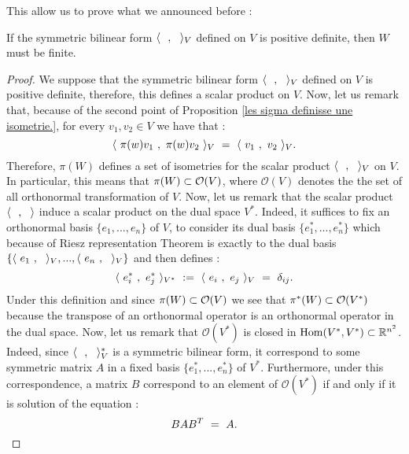 This allow us to prove what we announced before :
\begin{theorem}
	If the symmetric bilinear form  $\langle\text{ } \text{ },\text{ }\text{ }\rangle_V$ defined on $V$ is positive definite, then $W$ must be finite.
\end{theorem}
\begin{proof}
	We suppose that the symmetric bilinear form $\langle\text{ } \text{ },\text{ }\text{ }\rangle_V$ defined on $V$ is positive definite, therefore, this defines a scalar product on $V$. Now, let us remark that, because of the second point of Proposition \ref{les sigma definisse une isometrie.}, for every $v_1,v_2\in V$ we have that :
	\begin{equation}
	\langle\text{ } \pi(w)v_1\text{ },\text{ }\pi(w)v_2\text{ }\rangle_V\text{ }=\text{ } \langle\text{ } v_1\text{ },\text{ } v_2\text{ }\rangle_V.
	\end{equation}
	Therefore,  $\pi(W)$ defines a set of isometries for the scalar product $\langle\text{ } \text{ },\text{ }\text{ }\rangle_V$ on $V$. In particular, this means that $\pi(W)\subset \mathcal{O}(V)$, where $\mathcal{O}(V)$ denotes the the set of all orthonormal transformation of $V$.
	Now, let us remark that the scalar product $\langle\text{ } \text{ },\text{ }\text{ }\rangle$ induce a scalar product on the dual space $V^*$. Indeed, it suffices to fix an orthonormal basis $\{e_1,...,e_n\}$ of $V$, to consider its dual basis $\{e_1^*,...,e_n^*\}$ which because of Riesz representation Theorem is exactly to the dual basis $\{\langle\text{ } e_1\text{ },\text{ }\text{ }\rangle_V,...,\langle\text{ } e_n\text{ },\text{ }\text{ }\rangle_V\}$ and then defines :
	\begin{equation}
	\langle\text{ } e_i^*\text{ },\text{ } e_j^*\text{ }\rangle_{V^*}\text{ }:=\text{ }\langle\text{ } e_i\text{ },\text{ } e_j\text{ }\rangle_V\text{ }=\text{ } \delta_{ij}.
	\end{equation}
	Under this definition and since $\pi(W)\subset \mathcal{O}(V)$ we see that $\pi^*(W)\subset \mathcal{O}(V^*)$ because the transpose of an orthonormal operator is an orthonormal operator in the dual space. Now, let us remark that $\mathcal{O}(V^*)$ is closed in $\operatorname{Hom}(V^*,V^*)\subset \mathbb R^{n^2}$. Indeed, since $\langle\text{ } \text{ },\text{ }\text{ }\rangle_V^*$ is a symmetric bilinear form, it correspond to some symmetric matrix $A$ in a fixed basis $\{e_1^*,...,e_n^*\}$ of $V^*$. Furthermore, under this correspondence, a matrix $B$ correspond to an element of $\mathcal{O}(V^*)$ if and only if it is solution of the equation :
	 \begin{equation}
	 BAB^T\text{ }=\text{ } A.
	 \end{equation}

\end{proof}
